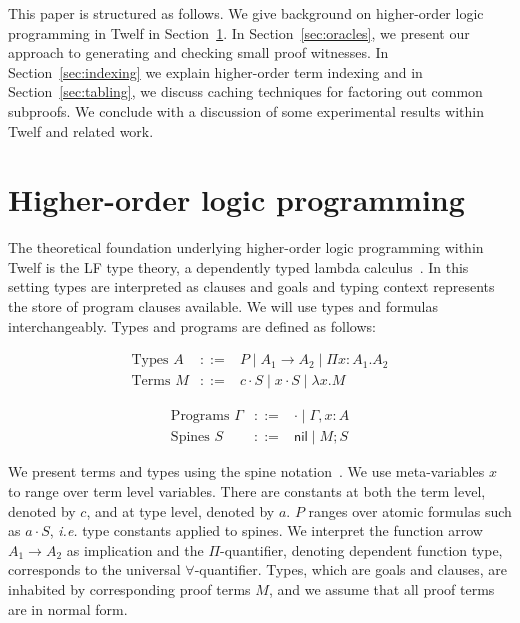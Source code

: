 \documentclass{llncs}
\newcommand{\comb}{\cdot}
\newcommand{\nil}{\mathsf{nil}}
\begin{document}
This paper is structured as follows. We give background on
higher-order logic programming in Twelf in Section~\ref{sec:twelf}. In
Section~\ref{sec:oracles}, we present our approach to generating and
checking small proof witnesses. In Section~\ref{sec:indexing} we explain 
higher-order term indexing and in Section~\ref{sec:tabling}, we
discuss caching techniques for factoring out common subproofs. We
conclude with a discussion of some experimental results within Twelf
and  related work.

\section{Higher-order logic programming}\label{sec:twelf}

The theoretical foundation underlying higher-order logic programming
within Twelf is the LF type theory, a dependently
typed lambda calculus~\cite{Pfenning91lf}. In this setting types are interpreted as
clauses and goals and typing context represents the store of program
clauses available. We will use types and formulas
interchangeably. Types and programs are defined as follows: 

\begin{center}
\begin{minipage}[b]{6.5cm}
\[
\begin{array}{lcl}
\mbox{Types } A & ::= & P \mid  A_1 \rightarrow A_2 \mid \Pi x:A_1.A_2 \\
\mbox{Terms }  M & ::= & c \comb S \mid x \comb S \mid \lambda x. M  
\end{array}
\]
\end{minipage}
\begin{minipage}[b]{5cm}
\[
\begin{array}{lcl}
\mbox{Programs }  \Gamma & ::= & \cdot \mid \Gamma, x:A \\
\mbox{Spines } S & ::= & \nil \mid M ; S
\end{array}
\]
\end{minipage}
\end{center}

We present terms and types using the spine
notation~\cite{cervesato+:spine}. We use meta-variables $x$ to range
over term level variables. There are constants at both the term level,
denoted by $c$, and at type level, denoted by $a$.  $P$ ranges over
atomic formulas such as $a \cdot S$, {\em i.e.} type constants applied
to spines. We interpret the function arrow $A_1 \rightarrow A_2$ as
implication and the $\Pi$-quantifier, denoting dependent function
type, corresponds to the universal $\forall$-quantifier. Types, which
are goals and clauses, are inhabited by corresponding proof terms $M$,
and we assume that all proof terms are in normal form.
\end{document}
